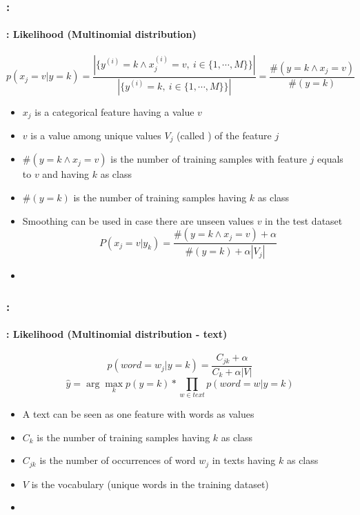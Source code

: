 \documentclass[xcolor=table]{beamer}
\begin{document}
\begin{frame}
	\frametitle{\insertshortsubtitle: \insertsection}
	\framesubtitle{\insertsubsection: Likelihood (Multinomial distribution)}
	
	\[p(x_j = v|y=k) = \frac{|\{y^{(i)} = k \wedge x^{(i)}_j = v,\ i \in \{1, \cdots, M\}\}|}{|\{y^{(i)} = k,\ i \in \{1, \cdots, M\}\}|} = \frac{\#(y = k \wedge x_j = v)}{\#(y = k)}\]
	
	\begin{itemize}
		\item $x_j$ is a categorical feature having a value $ v $
		\item $v$ is a value among unique values $ V_j $ (called ) of the feature $j$
		\item $\#(y = k \wedge x_j = v)$ is the number of training samples with feature $j$ equals to $v$ and having $k$ as class
		\item $\#(y = k)$ is the number of training samples having $k$ as class
		\item Smoothing can be used in case there are unseen values $v$ in the test dataset
		\[P(x_j = v|y_k) = \frac{\#(y = k \wedge x_j = v) + \alpha}{\#(y = k) + \alpha |V_j|}\]
		\item {}
		
	\end{itemize}
	
	
\end{frame}

\begin{frame}
	\frametitle{\insertshortsubtitle: \insertsection}
	\framesubtitle{\insertsubsection: Likelihood (Multinomial distribution - text)}
	
	\[p(word = w_j|y=k) = \frac{C_{jk} + \alpha}{C_k + \alpha |V|}\]
	\[\hat{y} = \arg\max_{k} p(y=k) * \prod_{w \in text} p(word = w|y=k)\]
	
	\begin{itemize}
		\item A text can be seen as one feature with words as values
		\item $C_k$ is the number of training samples having $k$ as class
		\item $C_{jk}$ is the number of occurrences of word $w_j$ in texts having $k$ as class
		\item $V$ is the vocabulary (unique words in the training dataset)
		\item {}
	\end{itemize}
	
\end{frame}
\end{document}
